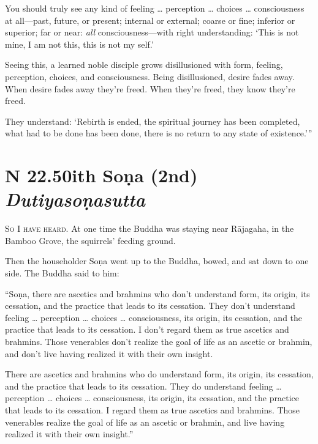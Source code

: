 \documentclass[12pt,openany]{book}%
\newcommand*{\suttatitleacronym}[1]{\smaller[2]{#1}\vspace*{.3em}}
\newcommand*{\suttatitletranslation}[1]{\linebreak{#1}}
\newcommand*{\suttatitleroot}[1]{\linebreak\smaller[2]\itshape{#1}}
\newcommand*{\tocacronym}[1]{\hspace*{-3.3em}{#1}\quad}
\newcommand*{\toctranslation}[1]{#1}
\newcommand*{\tocroot}[1]{(\textit{#1})}
\newcommand*{\scevam}[1]{\textsc{#1}}
\begin{document}
You should truly see any kind of feeling … perception … choices … consciousness at all—past, future, or present; internal or external; coarse or fine; inferior or superior; far or near: \emph{all} consciousness—with right understanding: ‘This is not mine, I am not this, this is not my self.’ 

Seeing this, a learned noble disciple grows disillusioned with form, feeling, perception, choices, and consciousness. Being disillusioned, desire fades away. When desire fades away they’re freed. When they’re freed, they know they’re freed. 

They understand: ‘Rebirth is ended, the spiritual journey has been completed, what had to be done has been done, there is no return to any state of existence.’” 

%
\section*{{\suttatitleacronym SN 22.50}{\suttatitletranslation With Soṇa (2nd) }{\suttatitleroot Dutiyasoṇasutta}}
\addcontentsline{toc}{section}{\tocacronym{SN 22.50} \toctranslation{With Soṇa (2nd) } \tocroot{Dutiyasoṇasutta}}

\scevam{So I have heard. }At one time the Buddha was staying near \textsanskrit{Rājagaha}, in the Bamboo Grove, the squirrels’ feeding ground. 

Then the householder \textsanskrit{Soṇa} went up to the Buddha, bowed, and sat down to one side. The Buddha said to him: 

“\textsanskrit{Soṇa}, there are ascetics and brahmins who don’t understand form, its origin, its cessation, and the practice that leads to its cessation. They don’t understand feeling … perception … choices … consciousness, its origin, its cessation, and the practice that leads to its cessation. I don’t regard them as true ascetics and brahmins. Those venerables don’t realize the goal of life as an ascetic or brahmin, and don’t live having realized it with their own insight. 

There are ascetics and brahmins who do understand form, its origin, its cessation, and the practice that leads to its cessation. They do understand feeling … perception … choices … consciousness, its origin, its cessation, and the practice that leads to its cessation. I regard them as true ascetics and brahmins. Those venerables realize the goal of life as an ascetic or brahmin, and live having realized it with their own insight.” 
\end{document}
